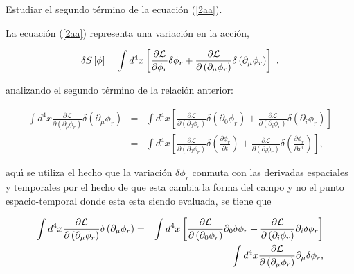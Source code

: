 \bigskip

\begin{exercise}
Estudiar el segundo término de la ecuación (\ref{2aa}).
\end{exercise}

\begin{solution}
La ecuaci\'{o}n (\ref{2aa}) representa una variaci\'{o}n en la acci\'{o}n,

\begin{equation*}
\delta S\left[ \phi \right] =\int d^{4}x\left[ \frac{\partial \mathcal{L}}{%
\partial \phi _{r}}\delta \phi _{r}+\frac{\partial \mathcal{L}}{\partial
\left( \partial _{\mu }\phi _{r}\right) }\delta \left( \partial _{\mu }\phi
_{r}\right) \right] ~,
\end{equation*}

analizando el segundo t\'{e}rmino de la relaci\'{o}n anterior:

\begin{eqnarray*}
\int d^{4}x\frac{\partial \mathcal{L}}{\partial \left( \partial _{\mu }\phi_{r}\right) }\delta \left( \partial _{\mu }\phi _{r}\right)  &=&\int d^{4}x\left[ \frac{\partial \mathcal{L}}{\partial \left( \partial _{0}\phi_{r}\right) }\delta \left( \partial _{0}\phi _{r}\right) +\frac{\partial \mathcal{L}}{\partial \left( \partial _{i}\phi _{r}\right) }\delta \left(\partial _{i}\phi _{r}\right) \right]  \\
&=&\int d^{4}x\left[ \frac{\partial \mathcal{L}}{\partial \left( \partial_{0}\phi _{r}\right) }\delta \left( \frac{\partial \phi _{r}}{\partial t} \right) +\frac{\partial \mathcal{L}}{\partial \left( \partial _{i}\phi_{r}\right) }\delta \left( \frac{\partial \phi _{r}}{\partial x^{i}}\right) \right] ,
\end{eqnarray*}

aqu\'{\i} se utiliza el hecho que la variaci\'{o}n $\delta \phi _{r}$ conmuta con las derivadas espaciales y temporales por el hecho de que esta cambia la forma del campo y no el punto espacio-temporal donde esta esta siendo evaluada, se tiene que

\begin{eqnarray}
\int d^{4}x\frac{\partial \mathcal{L}}{\partial \left( \partial _{\mu }\phi
_{r}\right) }\delta \left( \partial _{\mu }\phi _{r}\right)  &=&\int d^{4}x%
\left[ \frac{\partial \mathcal{L}}{\partial \left( \partial _{0}\phi
_{r}\right) }\partial _{0}\delta \phi _{r}+\frac{\partial \mathcal{L}}{%
\partial \left( \partial _{i}\phi _{r}\right) }\partial _{i}\delta \phi _{r}%
\right]   \notag \\
&=&\int d^{4}x\frac{\partial \mathcal{L}}{\partial \left( \partial _{\mu
}\phi _{r}\right) }\partial _{\mu }\delta \phi _{r},
\end{eqnarray}


\end{solution}
